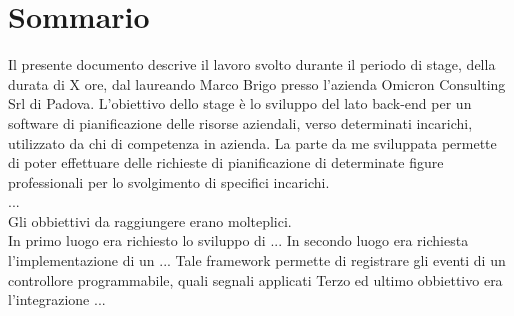 \cleardoublepage
{}
{}
\begingroup
\let\clearpage\relax
\let\cleardoublepage\relax
\let\cleardoublepage\relax

\chapter*{Sommario}

Il presente documento descrive il lavoro svolto durante il periodo di stage, della durata di X ore, dal laureando Marco Brigo presso l'azienda Omicron Consulting Srl di Padova.
L'obiettivo dello stage è lo sviluppo del lato back-end per un software di pianificazione delle risorse aziendali, verso determinati incarichi, utilizzato da chi di competenza in azienda.
La parte da me sviluppata permette di poter effettuare delle richieste di pianificazione di determinate figure professionali per lo svolgimento di specifici incarichi.\\
...\\
Gli obbiettivi da raggiungere erano molteplici.\\
In primo luogo era richiesto lo sviluppo di ...
In secondo luogo era richiesta l'implementazione di un ...
Tale framework permette di registrare gli eventi di un controllore programmabile, quali segnali applicati
Terzo ed ultimo obbiettivo era l'integrazione ...




\endgroup

\vfill
